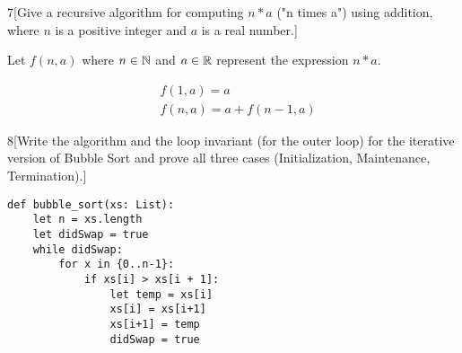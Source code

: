 \documentclass{homework}
\begin{document}

\begin{problem}{7}[Give a recursive algorithm for computing $n*a$ ("n times a") using addition, where $n$ is a positive integer and $a$ is a real number.]

Let $f(n, a)$ where $n \in \mathbb{N}$ and $a \in \mathbb{R}$ represent the expression $n * a$.

\begin{align*}
& f(1, a) = a \\
& f(n, a) = a + f(n - 1, a)
\end{align*}
\end{problem}



\begin{problem}{8}[Write the algorithm and the loop invariant (for the outer loop) for the iterative version of Bubble Sort and prove all three cases (Initialization, Maintenance, Termination).]

\begin{lstlisting}
def bubble_sort(xs: List):
    let n = xs.length
    let didSwap = true
    while didSwap:
        for x in {0..n-1}:
            if xs[i] > xs[i + 1]:
                let temp = xs[i]
                xs[i] = xs[i+1]
                xs[i+1] = temp
                didSwap = true
\end{lstlisting}
\end{problem}
\end{document}
